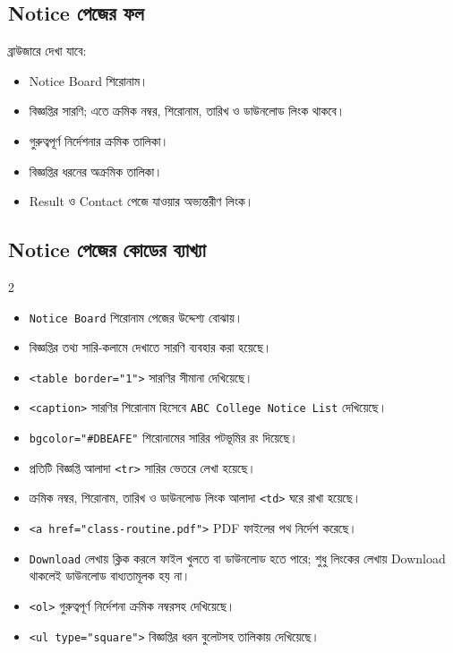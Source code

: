 \subsection{Notice পেজের ফল}

ব্রাউজারে দেখা যাবে:
\begin{itemize}
\item Notice Board শিরোনাম।
\item বিজ্ঞপ্তির সারণি; এতে ক্রমিক নম্বর, শিরোনাম, তারিখ ও ডাউনলোড লিংক থাকবে।
\item গুরুত্বপূর্ণ নির্দেশনার ক্রমিক তালিকা।
\item বিজ্ঞপ্তির ধরনের অক্রমিক তালিকা।
\item Result ও Contact পেজে যাওয়ার অভ্যন্তরীণ লিংক।
\end{itemize}

\subsection{Notice পেজের কোডের ব্যাখ্যা}

\par\noindent
\begin{multicols}{2}
\begin{itemize}
\item \texttt{Notice Board} শিরোনাম পেজের উদ্দেশ্য বোঝায়।
\item বিজ্ঞপ্তির তথ্য সারি-কলামে দেখাতে সারণি ব্যবহার করা হয়েছে।
\item \texttt{<table border="1">} সারণির সীমানা দেখিয়েছে।
\item \texttt{<caption>} সারণির শিরোনাম হিসেবে \texttt{ABC College Notice List} দেখিয়েছে।
\item \texttt{bgcolor="\#DBEAFE"} শিরোনামের সারির পটভূমির রং দিয়েছে।
\item প্রতিটি বিজ্ঞপ্তি আলাদা \texttt{<tr>} সারির ভেতরে লেখা হয়েছে।


\item ক্রমিক নম্বর, শিরোনাম, তারিখ ও ডাউনলোড লিংক আলাদা \texttt{<td>} ঘরে রাখা হয়েছে।
\item \texttt{<a href="class-routine.pdf">} PDF ফাইলের পথ নির্দেশ করেছে।
\item \texttt{Download} লেখায় ক্লিক করলে ফাইল খুলতে বা ডাউনলোড হতে পারে; শুধু লিংকের লেখায় Download থাকলেই ডাউনলোড বাধ্যতামূলক হয় না।
\item \texttt{<ol>} গুরুত্বপূর্ণ নির্দেশনা ক্রমিক নম্বরসহ দেখিয়েছে।
\item \texttt{<ul type="square">} বিজ্ঞপ্তির ধরন বুলেটসহ তালিকায় দেখিয়েছে।
\end{itemize}
\end{multicols}
\par


